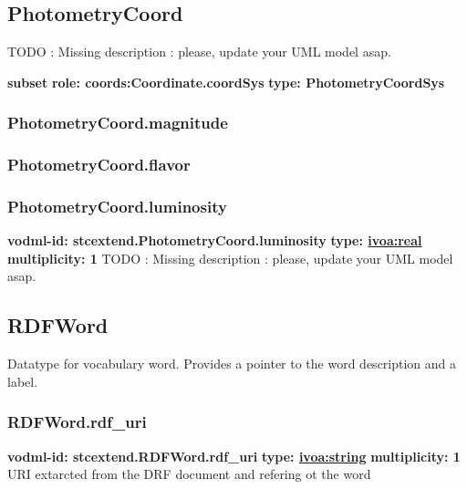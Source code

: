   \subsection{PhotometryCoord}
  \label{sect:stcextend.PhotometryCoord}
    TODO : Missing description : please, update your UML model asap.
    
   
    

    \noindent \textbf{subset} \newline
    \indent   \textbf{role: coords:Coordinate.coordSys} \newline
    \indent   \textbf{type: PhotometryCoordSys} \newline
    
    
    \subsubsection{PhotometryCoord.magnitude}
    
    
    \subsubsection{PhotometryCoord.flavor}

    \subsubsection{PhotometryCoord.luminosity}
      \textbf{vodml-id: stcextend.PhotometryCoord.luminosity} \newline
      \textbf{type: \hyperref[sect:ivoa]{ivoa:real}} \newline
      \textbf{multiplicity: 1} \newline 
      TODO : Missing description : please, update your UML model asap.

  \subsection{RDFWord}
  \label{sect:stcextend.RDFWord}
    Datatype for vocabulary word. Provides a pointer to the word description and a label.

    \subsubsection{RDFWord.rdf\_uri}
      \textbf{vodml-id: stcextend.RDFWord.rdf\_uri} \newline
      \textbf{type: \hyperref[sect:ivoa]{ivoa:string}} \newline
      \textbf{multiplicity: 1} \newline 
      URI extarcted from the DRF document and refering ot the word

